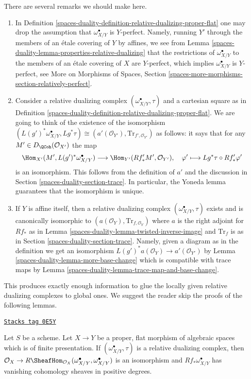 There are several remarks we should make here.
\begin{enumerate}
\item In Definition \ref{spaces-duality-definition-relative-dualizing-proper-flat}
one may drop the assumption that $\omega_{X/Y}^\bullet$ is $Y$-perfect.
Namely, running $Y'$ through the members of an \'etale covering of $Y$
by affines, we see from Lemma \ref{spaces-duality-lemma-properties-relative-dualizing}
that the restrictions of $\omega_{X/Y}^\bullet$ to the members of
an \'etale covering of $X$ are $Y$-perfect, which implies
$\omega_{X/Y}^\bullet$ is $Y$-perfect, see
More on Morphisms of Spaces, Section
\ref{spaces-more-morphisms-section-relatively-perfect}.
\item Consider a relative dualizing complex
$(\omega_{X/Y}^\bullet, \tau)$ and a cartesian square as in
Definition \ref{spaces-duality-definition-relative-dualizing-proper-flat}.
We are going to think of the existence of the isomorphism
$(L(g')^*\omega_{X/Y}^\bullet, Lg^*\tau) \cong
(a'(\mathcal{O}_{Y'}), \text{Tr}_{f', \mathcal{O}_{Y'}})$
as follows: it says that for any $M' \in D_\QCoh(\mathcal{O}_{X'})$
the map
$$
\Hom_{X'}(M', L(g')^*\omega_{X/Y}^\bullet)
\longrightarrow
\Hom_{Y'}(Rf'_*M', \mathcal{O}_{Y'}),\quad
\varphi' \longmapsto Lg^*\tau \circ Rf'_*\varphi'
$$
is an isomorphism. This follows from the definition of $a'$
and the discussion in Section \ref{spaces-duality-section-trace}. In particular,
the Yoneda lemma guarantees that the isomorphism is unique.
\item If $Y$ is affine itself, then a relative dualizing complex
$(\omega_{X/Y}^\bullet, \tau)$ exists and is canonically isomorphic
to $(a(\mathcal{O}_Y), \text{Tr}_{f, \mathcal{O}_Y})$ where
$a$ is the right adjoint for $Rf_*$ as in
Lemma \ref{spaces-duality-lemma-twisted-inverse-image}
and $\text{Tr}_f$ is as in Section \ref{spaces-duality-section-trace}.
Namely, given a diagram as in the definition we get
an isomorphism $L(g')^*a(\mathcal{O}_Y) \to a'(\mathcal{O}_{Y'})$ by
Lemma \ref{spaces-duality-lemma-more-base-change}
which is compatible with trace maps by
Lemma \ref{spaces-duality-lemma-trace-map-and-base-change}.
\end{enumerate}
This produces exactly enough information to glue the locally given
relative dualizing complexes to global ones. We suggest the reader
skip the proofs of the following lemmas.

\begin{lemma}
\label{spaces-duality-lemma-relative-dualizing-RHom}
\href{https://stacks.math.columbia.edu/tag/0E5Y}{\texttt{Stacks tag 0E5Y}}

Let $S$ be a scheme. Let $X \to Y$ be a proper, flat morphism of
algebraic spaces which is of finite presentation.
If $(\omega_{X/Y}^\bullet, \tau)$ is a relative dualizing complex,
then  $\mathcal{O}_X \to
R\SheafHom_{\mathcal{O}_X}(\omega_{X/Y}^\bullet, \omega_{X/Y}^\bullet)$
is an isomorphism and $Rf_*\omega_{X/Y}^\bullet$ has vanishing cohomology
sheaves in positive degrees.
\end{lemma}


